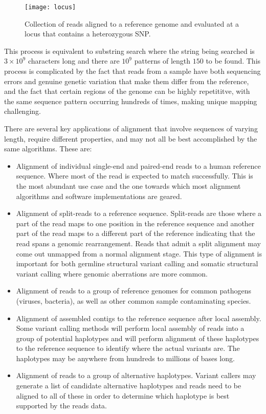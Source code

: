 \begin{figure}[H]
    \texttt{[image: locus]}
    \centering
    \caption {Collection of reads aligned to a reference genome and evaluated at a locus that contains a heterozygous SNP.}
    \label{fig:locus}
\end{figure}

This process is equivalent to substring search where the string being searched is $3\times10^9$ characters long and there are $10^9$ patterns of length $150$ to be found. This process is complicated by the fact that reads from a sample have both sequencing errors and genuine genetic variation that make them differ from the reference, and the fact that certain regions of the genome can be highly repetititve, with the same sequence pattern occurring hundreds of times, making unique mapping challenging.

There are several key applications of alignment that involve sequences of varying length, require different properties, and may not all be best accomplished by the same algorithms. These are:

\begin{itemize}
    \item Alignment of individual single-end and paired-end reads to a human reference sequence. Where most of the read is expected to match successfully. This is the most abundant use case and the one towards which most alignment algorithms and software implementations are geared.
    \item Alignment of split-reads to a reference sequence. Split-reads are those where a part of the read maps to one position in the reference sequence and another part of the read maps to a different part of the reference indicating that the read spans a genomic rearrangement. Reads that admit a split alignment may come out unmapped from a normal alignment stage. This type of alignment is important for both germline structural variant calling and somatic structural variant calling where genomic aberrations are more common.
    \item Alignment of reads to a group of reference genomes for common pathogens (viruses, bacteria), as well as other common sample contaminating species.
    \item Alignment of assembled contigs to the reference sequence after local assembly. Some variant calling methods will perform local assembly of reads into a group of potential haplotypes and will perform alignment of these haplotypes to the reference sequence to identify where the actual variants are. The haplotypes may be anywhere from hundreds to millions of bases long.
    \item Alignment of reads to a group of alternative haplotypes. Variant callers may generate a list of candidate alternative haplotypes and reads need to be aligned to all of these in order to determine which haplotype is best supported by the reads data.      
\end{itemize}


